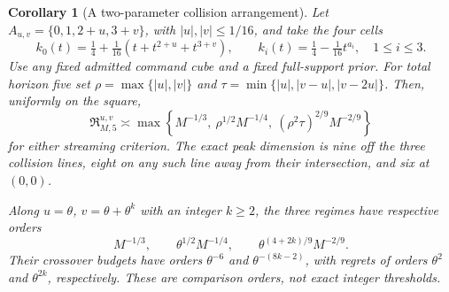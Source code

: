\documentclass[11pt]{amsart}
\newtheorem{corollary}[theorem]{Corollary}
\theoremstyle{definition}\newtheorem{definition}[theorem]{Definition}
\theoremstyle{remark}\newtheorem{remark}[theorem]{Remark}
\begin{document}
\begin{corollary}[A two-parameter collision arrangement]\label{cor:two-parameter}
Let $A_{u,v}=\{0,1,2+u,3+v\}$, with
$|u|,|v|\le1/16$, and take the four cells
\[
 k_0(t)=\tfrac14+\tfrac1{16}(t+t^{2+u}+t^{3+v}),\qquad
 k_i(t)=\tfrac14-\tfrac1{16}t^{a_i},\quad 1\le i\le3.
\]
Use any fixed admitted command cube and a fixed full-support prior.
For total horizon five set
$\rho=\max\{|u|,|v|\}$ and
$\tau=\min\{|u|,|v-u|,|v-2u|\}$. Then, uniformly on the square,
\begin{equation}\label{eq:two-parameter-law}
 \mathfrak R_{M,5}^{u,v}\asymp
 \max\left\{M^{-1/3},\ \rho^{1/2}M^{-1/4},\
           (\rho^2\tau)^{2/9}M^{-2/9}\right\}
\end{equation}
for either streaming criterion. The exact peak dimension is nine off the
three collision lines, eight on any such line away from their intersection,
and six at $(0,0)$.

Along $u=\theta$, $v=\theta+\theta^k$ with an integer $k\ge2$,
the three regimes have respective orders
\[
 M^{-1/3},\qquad \theta^{1/2}M^{-1/4},\qquad
       \theta^{(4+2k)/9}M^{-2/9}.
\]
Their crossover budgets have orders $\theta^{-6}$ and
$\theta^{-(8k-2)}$, with regrets of orders $\theta^2$ and
$\theta^{2k}$, respectively. These are comparison orders, not exact
integer thresholds.
\end{corollary}
\end{document}

